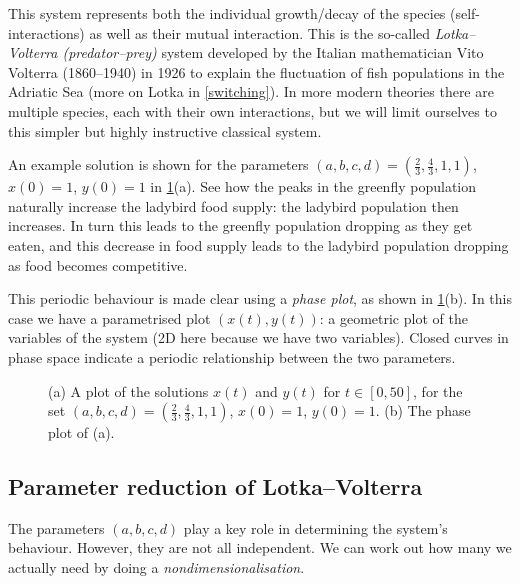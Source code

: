 \documentclass[main.tex]{subfiles}
\begin{document}
This system represents both the individual growth/decay of the species (self-interactions) as well as their mutual interaction. This is the so-called \emph{Lotka--Volterra (predator--prey)} system developed by the Italian mathematician Vito Volterra (1860--1940) in 1926 to explain the fluctuation of fish populations in the Adriatic Sea (more on Lotka in \cref{switching}). In more modern theories there are multiple species, each with their own interactions, but we will limit ourselves to this simpler but highly instructive classical system. 

An example solution is shown for the parameters $(a,b,c,d) = (\frac23,\frac43,1,1)$, $x(0)=1$, $y(0)=1$ in \cref{lotkasols}(a). See how the peaks in the greenfly population naturally increase the ladybird food supply: the ladybird population then increases. In turn this leads to the greenfly population dropping as they get eaten, and this decrease in food supply leads to the ladybird population dropping as food becomes competitive. 

This periodic behaviour is made clear using a \emph{phase plot}, as shown in \cref{lotkasols}(b). In this case we have a parametrised plot $(x(t),y(t))$: a geometric plot of the variables of the system (2D here because we have two variables). Closed curves in phase space indicate a periodic relationship between the two parameters.

\begin{figure}
\begin{subfigure}[t]{0.49\textwidth}
	\centering
	
\end{subfigure}
\begin{subfigure}[t]{0.49\textwidth}
	\centering
	
\end{subfigure}
\caption{\label{lotkasols}(a) A plot of the solutions $x(t)$ and $y(t)$ for $t \in[0,50]$, for the set $(a,b,c,d) = (\frac23,\frac43,1,1)$, $x(0)=1$, $y(0)=1$. (b) The phase plot of (a).}
\end{figure}


\subsection{Parameter reduction of Lotka--Volterra}
The parameters $(a,b,c,d)$ play a key role in determining the system's behaviour. However, they are not all independent. We can work out how many we actually need by doing a \emph{nondimensionalisation}.
\end{document}
